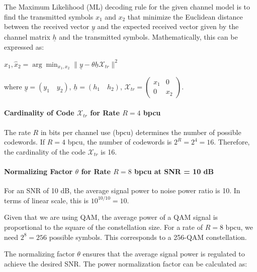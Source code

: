 \documentclass[11pt]{article}
\begin{document}
The Maximum Likelihood (ML) decoding rule for the given channel model is
to find the transmitted symbols \(x_1\) and \(x_2\) that minimize the
Euclidean distance between the received vector \(\underline{y}\) and the
expected received vector given by the channel matrix \(\underline{h}\)
and the transmitted symbols. Mathematically, this can be expressed as:

\(\hat{x}_1, \hat{x}_2 = \arg\min_{x_1, x_2} \| \underline{y} - \theta \underline{h} \mathcal{X}_{tr} \|^2\)

where \(\underline{y} = (y_1 \quad y_2)\),
\(\underline{h} = (h_1 \quad h_2)\),
\(\mathcal{X}_{tr} = \begin{pmatrix} x_1 & 0 \\ 0 & x_2 \end{pmatrix}\).

\paragraph{\texorpdfstring{Cardinality of Code \(\mathcal{X}_{tr}\) for
Rate \(R = 4\)
bpcu}{Cardinality of Code \textbackslash mathcal\{X\}\_\{tr\} for Rate R = 4 bpcu}}\label{cardinality-of-code-mathcalx_tr-for-rate-r-4-bpcu}

The rate \(R\) in bits per channel use (bpcu) determines the number of
possible codewords. If \(R = 4\) bpcu, the number of codewords is
\(2^R = 2^4 = 16\). Therefore, the cardinality of the code
\(\mathcal{X}_{tr}\) is 16.

\paragraph{\texorpdfstring{Normalizing Factor \(\theta\) for Rate
\(R = 8\) bpcu at SNR = 10
dB}{Normalizing Factor \textbackslash theta for Rate R = 8 bpcu at SNR = 10 dB}}\label{normalizing-factor-theta-for-rate-r-8-bpcu-at-snr-10-db}

For an SNR of 10 dB, the average signal power to noise power ratio is
10. In terms of linear scale, this is \(10^{10/10} = 10\).

Given that we are using QAM, the average power of a QAM signal is
proportional to the square of the constellation size. For a rate of
\(R = 8\) bpcu, we need \(2^8 = 256\) possible symbols. This corresponds
to a 256-QAM constellation.

The normalizing factor \(\theta\) ensures that the average signal power
is regulated to achieve the desired SNR. The power normalization factor
can be calculated as:
\end{document}
